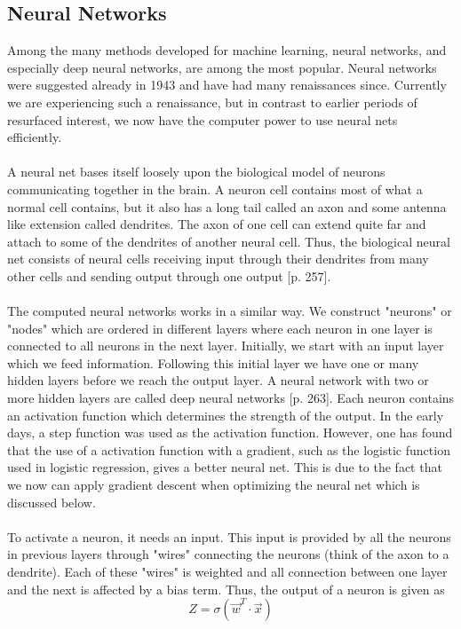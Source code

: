\documentclass[11pt]{article}
\begin{document}
\subsection{Neural Networks}
Among the many methods developed for machine learning, neural networks, and especially deep neural networks, are among the most popular. Neural networks were suggested already in 1943 \cite{McCulloch1943} and have had many renaissances since. Currently we are experiencing such a renaissance, but in contrast to earlier periods of resurfaced interest, we now have the computer power to use neural nets efficiently. \\ \\
A neural net bases itself loosely upon the biological model of neurons communicating together in the brain. A neuron cell contains most of what a normal cell contains, but it also has a long tail called an axon and some antenna like extension called dendrites. The axon of one cell can extend quite far and attach to some of the dendrites of another neural cell. Thus, the biological neural net consists of neural cells receiving input through their dendrites from many other cells and sending output through one output \cite{Geron}[p. 257]. \\ \\
The computed neural networks works in a similar way. We construct "neurons" or "nodes" which are ordered in different layers where each neuron in one layer is connected to all neurons in the next layer. Initially, we start with an input layer which we feed information. Following this initial layer we have one or many hidden layers before we reach the output layer. A neural network with two or more hidden layers are called deep neural networks \cite{Geron}[p. 263]. Each neuron contains an activation function which determines the strength of the output. In the early days, a step function was used as the activation function. However, one has found that the use of a activation function with a gradient, such as the logistic function used in logistic regression, gives a better neural net. This is due to the fact that we now can apply gradient descent when optimizing the neural net which is discussed below. \\ \\
To activate a neuron, it needs an input. This input is provided by all the neurons in previous layers through "wires" connecting the neurons (think of the axon to a dendrite). Each of these "wires" is weighted and all connection between one layer and the next is affected by a bias term. Thus, the output of a neuron is given as
\begin{equation}
Z = \sigma(\vec{w}^T \cdot \vec{x})
\end{equation}
\end{document}
